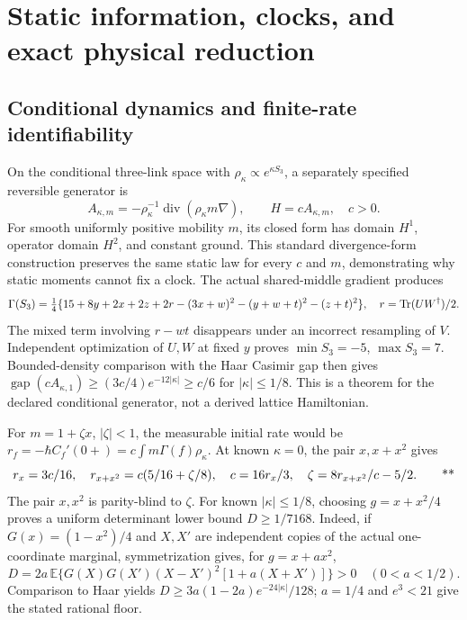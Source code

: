 \section{Static information, clocks, and exact physical reduction}
\label{sec:middle-inference}

\subsection{Conditional dynamics and finite-rate identifiability \workstar}
\label{sec:middle-clock}

On the conditional three-link space with
\(\rho_\kappa\propto e^{\kappa S_3}\), a separately specified reversible
generator is
\[
 A_{\kappa,m}=-\rho_\kappa^{-1}
       \operatorname{div}(\rho_\kappa m\nabla),\qquad H=cA_{\kappa,m},
 \quad c>0.
\]
For smooth uniformly positive mobility \(m\), its closed form has domain
\(H^1\), operator domain \(H^2\), and constant ground. This standard
divergence-form construction preserves the same static law for every \(c\)
and \(m\), demonstrating why static moments cannot fix a clock.
The actual shared-middle gradient produces
\[
 \Gamma(S_3)=\tfrac14\{15+8y+2x+2z+2r
 -(3x+w)^2-(y+w+t)^2-(z+t)^2\},\quad
 r=\operatorname{Tr}(UW^\dagger)/2.
\]
The mixed term involving \(r-wt\) disappears under an incorrect resampling
of \(V\). Independent optimization of \(U,W\) at fixed \(y\) proves
\(\min S_3=-5\), \(\max S_3=7\).
Bounded-density comparison with the Haar Casimir gap then gives
\(\operatorname{gap}(cA_{\kappa,1})\ge(3c/4)e^{-12|\kappa|}
\ge c/6\) for \(|\kappa|\le1/8\).
This is a theorem for the declared conditional generator, not a derived
lattice Hamiltonian.

For \(m=1+\zeta x\), \(|\zeta|<1\), the measurable initial rate would be
\(r_f=-\hbar C_f'(0+)=c\int m\Gamma(f)\rho_\kappa\).
At known \(\kappa=0\), the pair \(x,x+x^2\) gives
\[
 r_x=3c/16,\quad r_{x+x^2}=c(5/16+\zeta/8),\quad
 c=16r_x/3,\quad\zeta=8r_{x+x^2}/c-5/2.
 \qquad\text{**}
\]
The pair \(x,x^2\) is parity-blind to \(\zeta\).
For known \(|\kappa|\le1/8\), choosing \(g=x+x^2/4\) proves
a uniform determinant lower bound \(D\ge1/7168\). Indeed, if
\(G(x)=(1-x^2)/4\) and \(X,X'\) are independent copies of the actual
one-coordinate marginal, symmetrization gives, for \(g=x+ax^2\),
\[
 D=2a\,\mathbb E\{G(X)G(X')(X-X')^2[1+a(X+X')]\}>0
 \quad(0<a<1/2).
\]
Comparison to Haar yields
\(D\ge3a(1-2a)e^{-24|\kappa|}/128\); \(a=1/4\) and \(e^3<21\)
give the stated rational floor.

